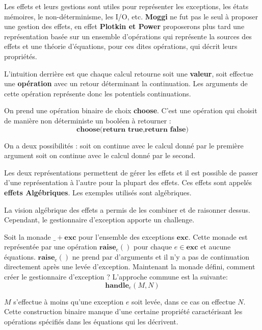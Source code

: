 	Les effets et leurs gestions sont utiles pour représenter les exceptions, les états mémoires, le non-déterminisme, les I/O, etc. \textbf{Moggi} ne fut pas le seul à proposer une gestion des effets, en effet \textbf{Plotkin et Power} proposerons plus tard une représentation basée sur un ensemble d'opérations qui représente la sources des effets et une théorie d'équations, pour ces dites opérations, qui décrit leurs propriétés.
	
	L'intuition derrière est que chaque calcul retourne soit une \textbf{valeur}, soit effectue une \textbf{opération} avec un retour déterminant la continuation. Les arguments de cette opération représente donc les potentiels continuations.
	
	\begin{exemple}
		On prend une opération binaire de choix \textbf{choose}. C'est une opération qui choisit de manière non déterministe un booléen à retourner :
		\[\textbf{choose(return true,return false)}\]
		
		On a deux possibilités : soit on continue avec le calcul donné par le première argument soit on continue avec le calcul donné par le second.
	\end{exemple}

	Les deux représentations permettent de gérer les effets et il est possible de passer d'une représentation à l'autre pour la plupart des effets. Ces effets sont appelés \textbf{effets Algébriques}. Les exemples utilisés sont algébriques.
	\medbreak
	
	La vision algébrique des effets a permis de les combiner et de raisonner dessus. Cependant, le gestionnaire d'exception apporte un challenge.
	\smallbreak
	
	Soit la monade $\_ + \textbf{exc}$ pour l'ensemble des exceptions $\textbf{exc}$. Cette monade est représentée par une opération $\textbf{raise}_e()$ pour chaque $e \in \textbf{exc}$ et aucune équations. $\textbf{raise}_e()$ ne prend par d'arguments et il n'y a pas de continuation directement après une levée d'exception. Maintenant la monade défini, comment créer le gestionnaire d'exception ? L'approche commune est la suivante:
	\[\textbf{handle}_e(M,N)\]
		
	$M$ s'effectue à moins qu'une exception $e$ soit levée, dans ce cas on effectue $N$. Cette construction binaire manque d'une certaine propriété caractérisant les opérations spécifiés dans les équations qui les décrivent.
	
